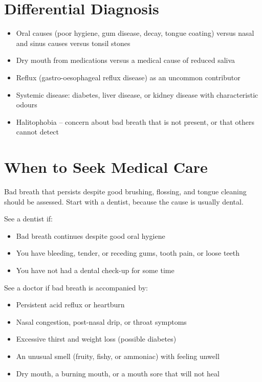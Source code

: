 \section*{Differential Diagnosis}
\begin{itemize}
    \item Oral causes (poor hygiene, gum disease, decay, tongue coating) versus nasal and sinus causes versus tonsil stones
    \item Dry mouth from medications versus a medical cause of reduced saliva
    \item Reflux (gastro-oesophageal reflux disease) as an uncommon contributor
    \item Systemic disease: diabetes, liver disease, or kidney disease with characteristic odours
    \item Halitophobia -- concern about bad breath that is not present, or that others cannot detect
\end{itemize}

\section*{When to Seek Medical Care}
Bad breath that persists despite good brushing, flossing, and tongue cleaning should be assessed. Start with a dentist, because the cause is usually dental.

See a dentist if:
\begin{itemize}
    \item Bad breath continues despite good oral hygiene
    \item You have bleeding, tender, or receding gums, tooth pain, or loose teeth
    \item You have not had a dental check-up for some time
\end{itemize}

See a doctor if bad breath is accompanied by:
\begin{itemize}
    \item Persistent acid reflux or heartburn
    \item Nasal congestion, post-nasal drip, or throat symptoms
    \item Excessive thirst and weight loss (possible diabetes)
    \item An unusual smell (fruity, fishy, or ammoniac) with feeling unwell
    \item Dry mouth, a burning mouth, or a mouth sore that will not heal
\end{itemize}

